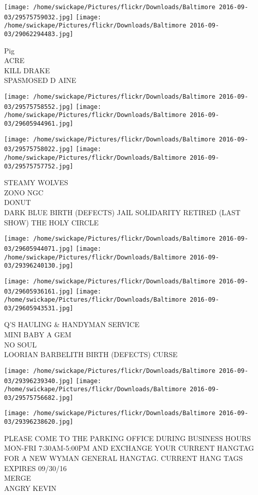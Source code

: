 \documentclass[10pt,letterpaper]{article}
\begin{document}
\texttt{[image: /home/swickape/Pictures/flickr/Downloads/Baltimore 2016-09-03/29575759032.jpg]}
\texttt{[image: /home/swickape/Pictures/flickr/Downloads/Baltimore 2016-09-03/29062294483.jpg]}

Pig\\
ACRE\\
KILL DRAKE\\
SPASMOSED D AINE
\pagebreak

\texttt{[image: /home/swickape/Pictures/flickr/Downloads/Baltimore 2016-09-03/29575758552.jpg]}
\texttt{[image: /home/swickape/Pictures/flickr/Downloads/Baltimore 2016-09-03/29605944961.jpg]}

\texttt{[image: /home/swickape/Pictures/flickr/Downloads/Baltimore 2016-09-03/29575758022.jpg]}
\texttt{[image: /home/swickape/Pictures/flickr/Downloads/Baltimore 2016-09-03/29575757752.jpg]}

STEAMY WOLVES\\
ZONO NGC\\
DONUT\\
DARK BLUE BIRTH (DEFECTS) JAIL SOLIDARITY RETIRED (LAST SHOW) THE HOLY CIRCLE
\pagebreak

\texttt{[image: /home/swickape/Pictures/flickr/Downloads/Baltimore 2016-09-03/29605944071.jpg]}
\texttt{[image: /home/swickape/Pictures/flickr/Downloads/Baltimore 2016-09-03/29396240130.jpg]}

\texttt{[image: /home/swickape/Pictures/flickr/Downloads/Baltimore 2016-09-03/29605936161.jpg]}
\texttt{[image: /home/swickape/Pictures/flickr/Downloads/Baltimore 2016-09-03/29605943531.jpg]}

Q'S HAULING \& HANDYMAN SERVICE\\
MINI BABY A GEM\\
NO SOUL\\
LOORIAN BARBELITH BIRTH (DEFECTS) CURSE
\pagebreak

\texttt{[image: /home/swickape/Pictures/flickr/Downloads/Baltimore 2016-09-03/29396239340.jpg]}
\texttt{[image: /home/swickape/Pictures/flickr/Downloads/Baltimore 2016-09-03/29575756682.jpg]}

\vspace{0.25in}
\texttt{[image: /home/swickape/Pictures/flickr/Downloads/Baltimore 2016-09-03/29396238620.jpg]}

PLEASE COME TO THE PARKING OFFICE DURING BUSINESS HOURS MON{-}FRI 7:30AM{-}5:00PM AND EXCHANGE YOUR CURRENT HANGTAG FOR A NEW WYMAN GENERAL HANGTAG.  CURRENT HANG TAGS EXPIRES 09/30/16\\
MERGE\\
ANGRY KEVIN
\pagebreak
\end{document}
